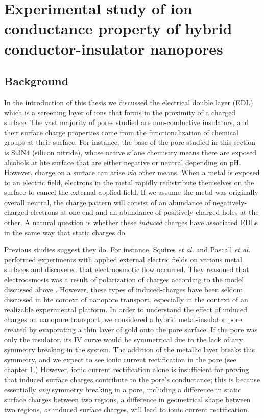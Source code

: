 \graphicspath{{../images/ch3/}}	%


\chapter{Experimental study of ion conductance property of hybrid conductor-insulator nanopores}

	

	\section{Background}
	
		In the introduction of this thesis we discussed the electrical double layer (EDL) which is a screening layer of ions that forms in the proximity of a charged surface. The vast majority of pores studied are non-conductive insulators, and their surface charge properties come from the functionalization of chemical groups at their surface. For instance, the base of the pore studied in this section is Si3N4 (silicon nitride), whose native silane chemistry means there are exposed alcohols at hte surface that are either negative or neutral depending on pH. However, charge on a surface can arise \textit{via} other means. When a metal is exposed to an electric field, electrons in the metal rapidly redistribute themselves on the surface to cancel the external applied field. If we assume the metal was originally overall neutral, the charge pattern will consist of an abundance of negatively-charged electrons at one end and an abundance of positively-charged holes at the other. A natural question is whether these \textit{induced} charges have associated EDLs in the same way that static charges do.
		
		Previous studies suggest they do. For instance, Squires \textit{et al.} and Pascall \textit{et al.} performed experiments with applied external electric fields on various metal surfaces and discovered that electroosmotic flow occurred. They reasoned that electroosmosis was a result of polarization of charges according to the model discussed above \cite{Squires2004, Pascall2010}. However, these types of induced-charges have been seldom discussed in hte context of nanopore transport, especially in the context of an realizable experimental platform. In order to understand the effect of induced charges on nanopore transport, we considered a hybrid metal-insulator pore created by evaporating a thin layer of gold onto the pore surface. If the pore was only the insulator, its IV curve would be symmetrical due to the lack of any symmetry breaking in the system. The addition of the metallic layer breaks this symmetry, and we expect to see ionic current rectification in the pore (see chapter 1.) However, ionic current rectification alone is insufficient for proving that induced surface charges contribute to the pore's conductance; this is because essentially \textit{any} symmetry breaking in a pore, including a difference in static surface charges between two regions, a difference in geometrical shape between two regions, \textit{or} induced surface charges, will lead to ionic current rectification.
		
